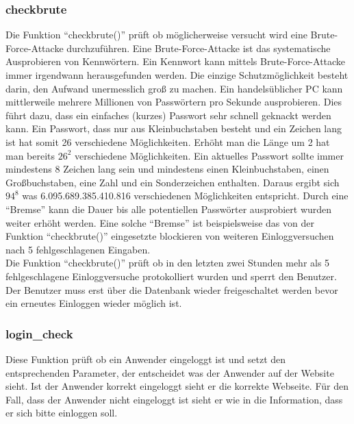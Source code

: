 \subsubsection{checkbrute}
Die Funktion "`checkbrute()"' prüft ob möglicherweise versucht wird eine Brute-Force-Attacke durchzuführen. Eine Brute-Force-Attacke ist das systematische Ausprobieren von Kennwörtern. Ein Kennwort kann mittels Brute-Force-Attacke immer irgendwann herausgefunden werden. Die einzige Schutzmöglichkeit besteht darin, den Aufwand unermesslich groß zu machen. Ein handelsüblicher PC kann mittlerweile mehrere Millionen von Passwörtern pro Sekunde ausprobieren. Dies führt dazu, dass ein einfaches (kurzes) Passwort sehr schnell geknackt werden kann. Ein Passwort, dass nur aus Kleinbuchstaben besteht und ein Zeichen lang ist hat somit 26 verschiedene Möglichkeiten. Erhöht man die Länge um 2 hat man bereits $26^2$ verschiedene Möglichkeiten. Ein aktuelles Passwort sollte immer mindestens 8 Zeichen lang sein und mindestens einen Kleinbuchstaben, einen Großbuchstaben, eine Zahl und ein Sonderzeichen enthalten. Daraus ergibt sich $94^8$ was 6.095.689.385.410.816 verschiedenen Möglichkeiten entspricht. Durch eine "`Bremse"' kann die Dauer bis alle potentiellen Passwörter ausprobiert wurden weiter erhöht werden. Eine solche "`Bremse"' ist beispielsweise das von der Funktion "`checkbrute()"' eingesetzte blockieren von weiteren Einloggversuchen nach 5 fehlgeschlagenen Eingaben.\\
Die Funktion "`checkbrute()"' prüft ob in den letzten zwei Stunden mehr als 5 fehlgeschlagene Einloggversuche protokolliert wurden und sperrt den Benutzer. Der Benutzer muss erst über die Datenbank wieder freigeschaltet werden bevor ein erneutes Einloggen wieder möglich ist.

\subsubsection{login\_check}
Diese Funktion prüft ob ein Anwender eingeloggt ist und setzt den entsprechenden
Parameter, der entscheidet was der Anwender auf der Website sieht. Ist der Anwender korrekt eingeloggt sieht er die korrekte Webseite. Für den Fall, dass der Anwender nicht eingeloggt ist sieht er wie in  die Information, dass er sich bitte einloggen soll.

